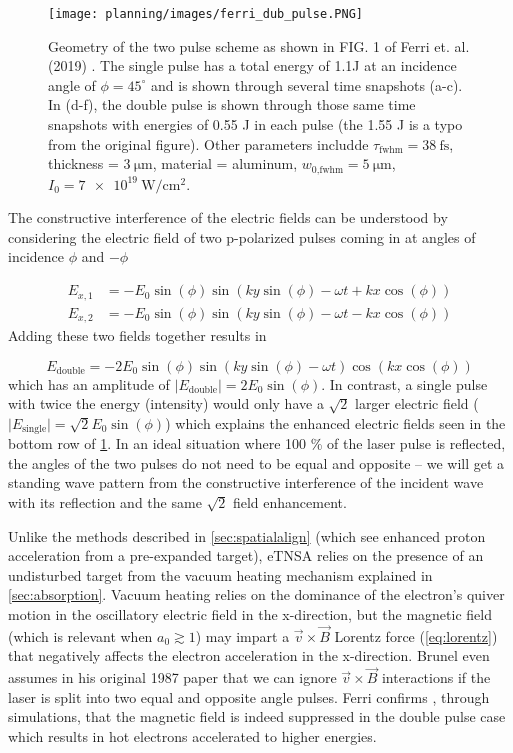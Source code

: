 \begin{figure}
	\centering 
	\texttt{[image: planning/images/ferri\_dub\_pulse.PNG]}
	\caption{Geometry of the two pulse scheme as shown in FIG. 1 of Ferri et. al. (2019) \cite{Ferri_2019_Nat_Comm}. The single pulse has a total energy of 1.1J at an incidence angle of $\phi=45^\circ$ and is shown through several time snapshots (a-c). In (d-f), the double pulse is shown through those same time snapshots with energies of 0.55 J in each pulse (the 1.55 J is a typo from the original figure). Other parameters includde $\tau_\text{fwhm} = \SI{38}{\femto \second}$, thickness = $\SI{3}{\micro \meter}$, material = aluminum, $w_\text{0,fwhm} = \SI{5}{\micro \meter}$, $I_0 = \SI{7e19}{\watt \per \centi \meter \squared}$.}
	\label{fig:ferri_dub_pulse}
\end{figure}
The constructive interference of the electric fields can be understood by considering the electric field of two p-polarized pulses coming in at angles of incidence $\phi$ and $-\phi$

\begin{align}
	E_{x,1} &= -E_0 \sin(\phi) \sin(k y \sin(\phi) - \omega t + k x \cos(\phi)) \\
	E_{x,2} &= -E_0 \sin(\phi) \sin(k y \sin(\phi) - \omega t - k x \cos(\phi))
\end{align}
Adding these two fields together results in 

\begin{equation}
	E_\text{double} = -2 E_0 \sin(\phi) \sin(k y \sin(\phi) - \omega t) \cos(k x \cos(\phi))
\end{equation}
which has an amplitude of $\lvert E_\text{double} \rvert = 2 E_0 \sin(\phi)$. In contrast, a single pulse with twice the energy (intensity) would only have a $\sqrt{2}$ larger electric field ($\lvert E_\text{single} \rvert = \sqrt{2} E_0 \sin(\phi)$) which explains the enhanced electric fields seen in the bottom row of \cref{fig:ferri_dub_pulse}. In an ideal situation where 100 \% of the laser pulse is reflected, the angles of the two pulses do not need to be equal and opposite -- we will get a standing wave pattern from the constructive interference of the incident wave with its reflection and the same $\sqrt{2}$ field enhancement.  

Unlike the methods described in \cref{sec:spatialalign} (which see enhanced proton acceleration from a pre-expanded target), eTNSA relies on the presence of an undisturbed target from the vacuum heating mechanism \cite{Brunel_1987_PRL} explained in \cref{sec:absorption}. Vacuum heating relies on the dominance of the electron's quiver motion in the oscillatory electric field in the x-direction, but the magnetic field (which is relevant when $a_0 \gtrsim 1$) may impart a $\vec{v} \times \vec{B}$ Lorentz force (\cref{eq:lorentz}) that negatively affects the electron acceleration in the x-direction. Brunel even assumes in his original 1987 paper \cite{Brunel_1987_PRL} that we can ignore $\vec{v} \times \vec{B}$ interactions if the laser is split into two equal and opposite angle pulses. Ferri confirms \cite{Ferri_2019_Nat_Comm}, through simulations, that the magnetic field is indeed suppressed in the double pulse case which results in hot electrons accelerated to higher energies. 

